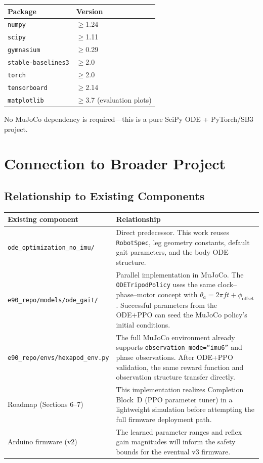 \documentclass[11pt]{article}
\begin{document}
\begin{center}
\begin{tabular}{ll}
\toprule
\textbf{Package} & \textbf{Version} \\
\midrule
\texttt{numpy} & $\geq$1.24 \\
\texttt{scipy} & $\geq$1.11 \\
\texttt{gymnasium} & $\geq$0.29 \\
\texttt{stable-baselines3} & $\geq$2.0 \\
\texttt{torch} & $\geq$2.0 \\
\texttt{tensorboard} & $\geq$2.14 \\
\texttt{matplotlib} & $\geq$3.7 (evaluation plots) \\
\bottomrule
\end{tabular}
\end{center}

No MuJoCo dependency is required---this is a pure SciPy ODE + PyTorch/SB3 project.

\section{Connection to Broader Project}
\label{sec:connection}

\subsection{Relationship to Existing Components}

\begin{center}
\begin{tabular}{p{4cm}p{9.5cm}}
\toprule
\textbf{Existing component} & \textbf{Relationship} \\
\midrule
\texttt{ode\_optimization\_no\_imu/} & Direct predecessor. This work reuses \texttt{RobotSpec}, leg geometry constants, default gait parameters, and the body ODE structure. \\
\addlinespace
\texttt{e90\_repo/models/ode\_gait/} & Parallel implementation in MuJoCo. The \texttt{ODETripodPolicy} uses the same clock--phase--motor concept with $\theta_a = 2\pi f t + \phi_{\mathrm{offset}}$. Successful parameters from the ODE+PPO can seed the MuJoCo policy's initial conditions. \\
\addlinespace
\texttt{e90\_repo/envs/hexapod\_env.py} & The full MuJoCo environment already supports \texttt{observation\_mode=``imu6''} and phase observations. After ODE+PPO validation, the same reward function and observation structure transfer directly. \\
\addlinespace
Roadmap (Sections 6--7) & This implementation realizes Completion Block~D (PPO parameter tuner) in a lightweight simulation before attempting the full firmware deployment path. \\
\addlinespace
Arduino firmware (v2) & The learned parameter ranges and reflex gain magnitudes will inform the safety bounds for the eventual v3 firmware. \\
\bottomrule
\end{tabular}
\end{center}
\end{document}
